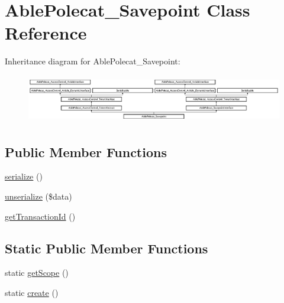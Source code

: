 \hypertarget{class_able_polecat___savepoint}{}\section{Able\+Polecat\+\_\+\+Savepoint Class Reference}
\label{class_able_polecat___savepoint}
Inheritance diagram for Able\+Polecat\+\_\+\+Savepoint\+:\begin{figure}[H]
\begin{center}
\leavevmode
\includegraphics[height=2.134146cm]{class_able_polecat___savepoint}
\end{center}
\end{figure}
\subsection*{Public Member Functions}
\begin{DoxyCompactItemize}
\item 
\hyperlink{class_able_polecat___savepoint_a4d9813fea8525b19a1d370eeb8fe41d6}{serialize} ()
\item 
\hyperlink{class_able_polecat___savepoint_a91b3cb8a65e42152cacf1cf222bd26f6}{unserialize} (\$data)
\item 
\hyperlink{class_able_polecat___savepoint_a83a4c2954e4da6dad24e596265e33d0a}{get\+Transaction\+Id} ()
\end{DoxyCompactItemize}
\subsection*{Static Public Member Functions}
\begin{DoxyCompactItemize}
\item 
static \hyperlink{class_able_polecat___savepoint_ad9ade868bd136d32967059d1cccb3e92}{get\+Scope} ()
\item 
static \hyperlink{class_able_polecat___savepoint_a239b1c70258014a86569483c2d009de6}{create} ()
\end{DoxyCompactItemize}
